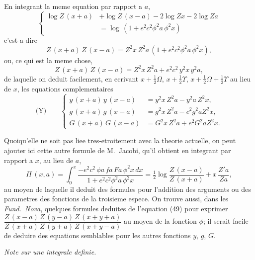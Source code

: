 \documentclass[11pt,a4paper]{book}
\begin{document}
En integrant la meme equation par rapport a $a$,
\begin{equation}
\left\{
\begin{aligned}
\log Z\, (x+a) &+ \log Z\, (x-a) - 2\log Zx - 2\log Za\\
&= \log\, (1 + e^2 c^2 \phi^2 a\, \phi^2 x)
\end{aligned}
\right. \tag{51}
\end{equation}
c'est-a-dire
\begin{equation}
Z\, (x+a)\, Z\, (x-a) = Z^2x\, Z^2a\, (1 + e^2 c^2 \phi^2 a\, \phi^2 x), \tag{52}
\end{equation}
ou, ce qui est la meme chose,
\begin{equation}
Z\, (x+a)\, Z\, (x-a) = Z^2x\, Z^2a + e^2 c^2\, y^2x\, y^2a, \tag{53}
\end{equation}
de laquelle on deduit facilement, en ecrivant $x + \frac{1}{2}\Omega$, $x + \frac{1}{2}\Upsilon$, $x + \frac{1}{2}\Omega + \frac{1}{2}\Upsilon$ au lieu
de $x$, les equations complementaires
\begin{equation*}
\text{(Y)}\qquad
\left\{
\begin{aligned}
y\, (x+a)\, y\, (x-a) &= y^2x\, Z^2a - y^2a\, Z^2x,\\
g\, (x+a)\, g\, (x-a) &= g^2x\, Z^2a - c^2 g^2a Z^2x,\\
G\, (x+a)\, G\, (x-a) &= G^2x\, Z^2a + e^2 G^2a Z^2x.
\end{aligned}
\right.
\end{equation*}

Quoiqu'elle ne soit pas liee tres-etroitement avec la theorie actuelle, on peut
ajouter ici cette autre formule de M.~Jacobi, qu'il obtient en integrant par rapport a $x$,
au lieu de $a$,
\begin{equation}
\Pi\, (x, a) = \int_0^x \frac{-e^2 c^2\, \phi a\, fa\, Fa\, \phi^2 x\, dx}{1 + e^2 c^2 \phi^2 a\, \phi^2 x}
= \tfrac{1}{2}\log \frac{Z\, (x-a)}{Z\, (x+a)} + x\, \frac{Z'a}{Za}, \tag{54}
\end{equation}
au moyen de laquelle il deduit des formules pour l'addition des arguments ou des
parametres des fonctions de la troisieme espece. On trouve aussi, dans les \textit{Fund.~Nova},
quelques formules deduites de l'equation (49) pour exprimer
$\dfrac{Z\, (x-a)\, Z\, (y-a)\, Z\, (x+y+a)}{Z\, (x+a)\, Z\, (y+a)\, Z\, (x+y-a)}$
au moyen de la fonction $\phi$; il serait facile de deduire des equations semblables pour
les autres fonctions $y$, $g$, $G$.

\begin{center}
\textit{Note sur une integrale definie.}
\end{center}
\end{document}
